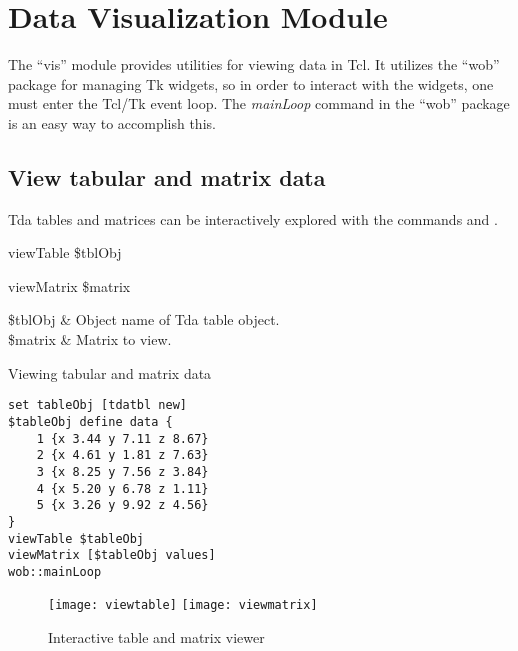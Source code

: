 \cleartooddpage[\thispagestyle{empty}]
\chapter{Data Visualization Module}
The ``vis'' module provides utilities for viewing data in Tcl. It utilizes the ``wob'' package for managing Tk widgets, so in order to interact with the widgets, one must enter the Tcl/Tk event loop. The \textit{mainLoop} command in the ``wob'' package is an easy way to accomplish this.

\clearpage
\section{View tabular and matrix data}
Tda tables and matrices can be interactively explored with the commands  and .

\begin{syntax}
viewTable \$tblObj
\end{syntax}
\begin{syntax}
viewMatrix \$matrix
\end{syntax}
\begin{args}
\$tblObj & Object name of Tda table object. \\
\$matrix  & Matrix to view. 
\end{args}
\begin{example}{Viewing tabular and matrix data}
\begin{lstlisting}
set tableObj [tdatbl new]
$tableObj define data {
    1 {x 3.44 y 7.11 z 8.67}
    2 {x 4.61 y 1.81 z 7.63}
    3 {x 8.25 y 7.56 z 3.84}
    4 {x 5.20 y 6.78 z 1.11}
    5 {x 3.26 y 9.92 z 4.56}
}
viewTable $tableObj
viewMatrix [$tableObj values]
wob::mainLoop
\end{lstlisting}
\end{example}
\begin{figure}[!htb]
\centering
\texttt{[image: viewtable]}
\texttt{[image: viewmatrix]}
\caption{Interactive table and matrix viewer}
\label{fig:viewdata}
\end{figure}


